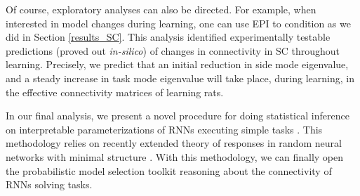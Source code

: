 \documentclass[11pt]{article}
\begin{document}
Of course, exploratory analyses can also be directed.  For example,  when interested in model changes during learning, one can use EPI to condition as we did in Section \ref{results_SC}.
This analysis identified experimentally testable predictions (proved out \textit{in-silico}) of changes in connectivity in SC throughout learning.
Precisely, we predict that an initial reduction in side mode eigenvalue, and a steady increase in task mode eigenvalue will take place, during learning, in the effective connectivity matrices of learning rats.

In our final analysis, we present a novel procedure for doing statistical inference on interpretable parameterizations of RNNs executing simple tasks .  This methodology relies on recently extended theory of responses in random neural networks with minimal structure \cite{mastrogiuseppe2018linking}. With this methodology, we can finally open the probabilistic model selection toolkit reasoning about the connectivity of RNNs solving tasks.

\end{document}

